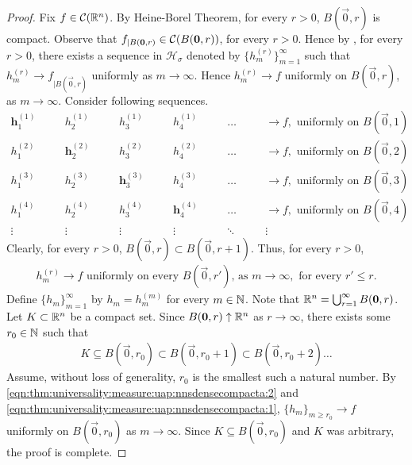 \begin{proof}

Fix $f \in {\mathcal C}({\mathbb R}^n)$. By Heine-Borel Theorem, for every $r > 0$, $B(\vec{0}, r)$ is compact. Observe that $f_{|  B(\mathbf{0}, r)} \in {\mathcal C}( B(\mathbf{0}, r))$, for every $r > 0$. Hence by , for every $r > 0$, there exists a sequence in $\mathcal{H}_{\sigma}$ denoted by $\{ h_{m}^{(r)} \}_{m = 1}^\infty$ such that $h_{m}^{(r)} \to f_{|  B(\vec{0}, r)}$ uniformly as $m \to \infty$. Hence $h_{m}^{(r)} \to f$ uniformly on $ B(\vec{0}, r)$, as $m \to \infty$. Consider following sequences.
\begin{align*}
    \textbf{h}_1^{(1)} &\quad& h_2^{(1)} &\quad& h_3^{(1)} &\quad& h_4^{(1)} &\quad& \ldots &\quad& \to f, \text{ uniformly on $B(\vec{0}, 1)$} \\
    h_1^{(2)}  &\quad& \textbf{h}_2^{(2)}  &\quad& h_3^{(2)}  &\quad& h_4^{(2)}  &\quad& \ldots  &\quad& \to f, \text{ uniformly on $B(\vec{0}, 2)$} \\
    h_1^{(3)}  &\quad& h_2^{(3)}  &\quad& \textbf{h}_3^{(3)}  &\quad& h_4^{(3)}  &\quad& \ldots  &\quad& \to f, \text{ uniformly on $B(\vec{0}, 3)$} \\ 
    h_1^{(4)}  &\quad& h_2^{(4)}  &\quad& h_3^{(4)}  &\quad& \textbf{h}_4^{(4)}  &\quad& \ldots  &\quad& \to f, \text{ uniformly on $B(\vec{0}, 4)$} \\ 
    \vdots  &\quad& \vdots &\quad& \vdots  &\quad& \vdots &\quad& \ddots &\quad& \vdots
\end{align*}
Clearly, for every $r > 0$, $B(\vec{0}, r) \subset B(\vec{0}, r + 1)$. Thus, for every $r > 0$,  \begin{align}
    \label{eqn:thm:universality:measure:uap:nnsdensecompacta:1}
    h_m^{(r)} \to f \text{ uniformly on every $B(\vec{0}, r')$, as $m \to \infty$}, \text{ for every $r' \leq r$.}
\end{align}
Define $\{ h_m \}_{m = 1}^\infty$ by $h_m = h_m^{(m)}$ for every $m \in {\mathbb N}$.
Note that ${\mathbb R}^n = \bigcup_{r = 1}^\infty B(\mathbf{0}, r)$. Let $K \subset {\mathbb R}^n$ be a compact set. Since $ B(\mathbf{0}, r) \uparrow {\mathbb R}^n$ as $r \to \infty$, there exists some $r_0 \in {\mathbb N}$ such that \begin{align}
    \label{eqn:thm:universality:measure:uap:nnsdensecompacta:2}
    K \subseteq B (\vec{0}, r_0) \subset  B (\vec{0}, r_0 + 1) \subset  B (\vec{0}, r_0 + 2) \ldots
\end{align}
Assume, without loss of generality, $r_0$ is the smallest such a natural number.
By \ref{eqn:thm:universality:measure:uap:nnsdensecompacta:2} and \ref{eqn:thm:universality:measure:uap:nnsdensecompacta:1}, $\{ h_m \}_{m \geq r_0} \to f$ uniformly on $B(\vec{0}, r_0)$ as $m \to \infty$. Since $K \subseteq B(\vec{0}, r_0)$ and $K$ was arbitrary, the proof is complete.
\end{proof}

